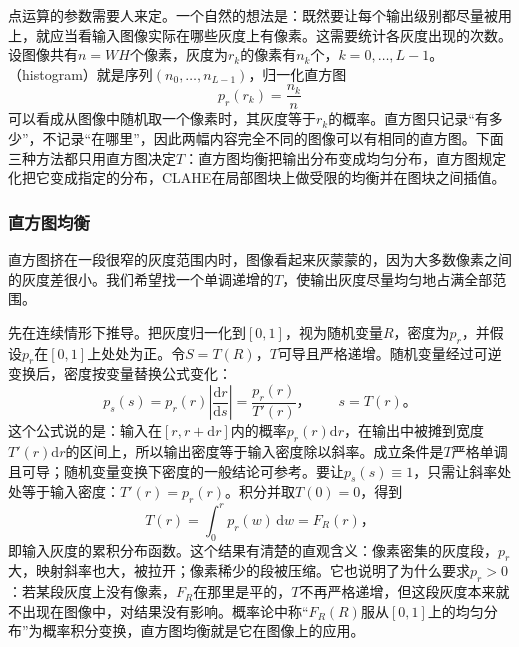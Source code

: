 点运算的参数需要人来定。一个自然的想法是：既然要让每个输出级别都尽量被用上，就应当看输入图像实际在哪些灰度上有像素。这需要统计各灰度出现的次数。设图像共有$n=WH$个像素，灰度为$r_k$的像素有$n_k$个，$k=0,\ldots,L-1$。（histogram）就是序列$(n_0,\ldots,n_{L-1})$，归一化直方图
\begin{equation}
  p_r(r_k)=\frac{n_k}{n}
  \label{eq:vision-transforms-normalized-histogram}
\end{equation}
可以看成从图像中随机取一个像素时，其灰度等于$r_k$的概率。直方图只记录“有多少”，不记录“在哪里”，因此两幅内容完全不同的图像可以有相同的直方图。下面三种方法都只用直方图决定$T$：直方图均衡把输出分布变成均匀分布，直方图规定化把它变成指定的分布，CLAHE在局部图块上做受限的均衡并在图块之间插值。

\subsubsection{直方图均衡}

直方图挤在一段很窄的灰度范围内时，图像看起来灰蒙蒙的，因为大多数像素之间的灰度差很小。我们希望找一个单调递增的$T$，使输出灰度尽量均匀地占满全部范围。

先在连续情形下推导。把灰度归一化到$[0,1]$，视为随机变量$R$，密度为$p_r$，并假设$p_r$在$[0,1]$上处处为正。令$S=T(R)$，$T$可导且严格递增。随机变量经过可逆变换后，密度按变量替换公式变化：
\begin{equation}
  p_s(s)=p_r(r)\left|\frac{\mathrm{d}r}{\mathrm{d}s}\right|=\frac{p_r(r)}{T'(r)}\text{，}\qquad s=T(r)\text{。}
  \label{eq:vision-transforms-change-of-variable}
\end{equation}
这个公式说的是：输入在$[r,r+\mathrm{d}r]$内的概率$p_r(r)\mathrm{d}r$，在输出中被摊到宽度$T'(r)\mathrm{d}r$的区间上，所以输出密度等于输入密度除以斜率。成立条件是$T$严格单调且可导；随机变量变换下密度的一般结论可参考。要让$p_s(s)\equiv1$，只需让斜率处处等于输入密度：$T'(r)=p_r(r)$。积分并取$T(0)=0$，得到
\begin{equation}
  T(r)=\int_{0}^{r}p_r(w)\,\mathrm{d}w=F_R(r)\text{，}
  \label{eq:vision-transforms-cdf}
\end{equation}
即输入灰度的累积分布函数。这个结果有清楚的直观含义：像素密集的灰度段，$p_r$大，映射斜率也大，被拉开；像素稀少的段被压缩。它也说明了为什么要求$p_r>0$：若某段灰度上没有像素，$F_R$在那里是平的，$T$不再严格递增，但这段灰度本来就不出现在图像中，对结果没有影响。概率论中称“$F_R(R)$服从$[0,1]$上的均匀分布”为概率积分变换，直方图均衡就是它在图像上的应用。

